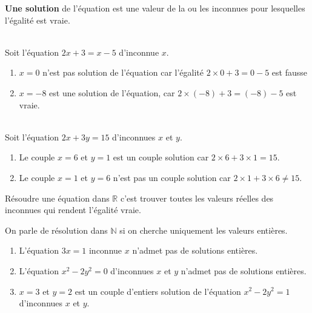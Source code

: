 \documentclass[main.tex]{subfiles}
\begin{document}
\textbf{Une solution} de l’équation est une valeur de la ou les inconnues pour lesquelles l’égalité est vraie. 
\begin{example}\hfill \\
	Soit l'équation $2x+3=x-5$ d'inconnue $x$.
	\begin{enumerate}[label=\alph*),leftmargin=*]
		\item $x=0$ n'est pas solution de l'équation car l'égalité $2\times 0+3=0-5$ est fausse
		\item $x=-8$ est une solution de l'équation, car $2\times(-8)+3=(-8)-5$ est vraie.
	\end{enumerate}
\end{example}
\begin{example}\hfill \\
	Soit l'équation $2x+3y=15$ d'inconnues $x$ et $y$.
	\begin{enumerate}[label=\alph*),leftmargin=*]
		\item Le couple  $x=6$ et $y=1$  est un couple solution car $2\times 6+3\times 1=15$.
		\item Le couple $x=1$ et $y=6$ n'est pas un couple solution car $2\times 1+3\times 6\neq 15$.  
	\end{enumerate}
\end{example}
\begin{definition} Résoudre une équation dans $\mathbb{R}$ c'est trouver toutes les valeurs  réelles des  inconnues qui rendent l'égalité vraie.
	
	On parle de résolution dans   $\mathbb{N}$ si on cherche uniquement les valeurs entières.
\end{definition} 
\newpage 
\begin{example}\hfill
	\begin{enumerate}[label=\alph*),leftmargin=*]
		\item L'équation $3x=1$ inconnue $x$ n'admet pas de solutions entières.
		\item L'équation $x^2-2y^2=0$ d'inconnues $x$ et $y$ n'admet pas de solutions entières.
		\item $x=3$ et $y=2$ est un couple d'entiers solution de l'équation $x^2-2y^2=1$ d'inconnues $x$ et $y$.
	\end{enumerate}
\end{example}
\end{document}
